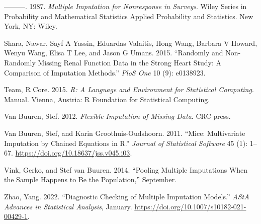 \documentclass[
]{article}
\newlength{\cslhangindent}
\newlength{\cslentryspacingunit} %
\newenvironment{CSLReferences}[2] %
 {%
  \setlength{\parindent}{0pt}
  \ifodd #1
  \let\oldpar\par
  \def\par{\hangindent=\cslhangindent\oldpar}
  \fi
  \setlength{\parskip}{#2\cslentryspacingunit}
 }%
 {}
\begin{document}
\begin{CSLReferences}{1}{0}
\leavevmode{}%
---------. 1987. \emph{Multiple {Imputation} for Nonresponse in
Surveys}. Wiley Series in Probability and Mathematical Statistics
{Applied} Probability and Statistics. {New York, NY}: {Wiley}.

\leavevmode{}%
Shara, Nawar, Sayf A Yassin, Eduardas Valaitis, Hong Wang, Barbara V
Howard, Wenyu Wang, Elisa T Lee, and Jason G Umans. 2015. {``Randomly
and Non-Randomly Missing Renal Function Data in the Strong Heart Study:
A Comparison of Imputation Methods.''} \emph{PloS One} 10 (9): e0138923.

\leavevmode{}%
Team, R Core. 2015. \emph{R: {A} Language and Environment for
Statistical Computing}. Manual. {Vienna, Austria}: {R Foundation for
Statistical Computing}.

\leavevmode{}%
Van Buuren, Stef. 2012. \emph{Flexible Imputation of Missing Data}. {CRC
press}.

\leavevmode{}%
Van Buuren, Stef, and Karin Groothuis-Oudshoorn. 2011. {``Mice:
{Multivariate Imputation} by {Chained Equations} in {R}.''}
\emph{Journal of Statistical Software} 45 (1): 1--67.
\url{https://doi.org/10.18637/jss.v045.i03}.

\leavevmode{}%
Vink, Gerko, and Stef van Buuren. 2014. {``Pooling Multiple Imputations
When the Sample Happens to Be the Population,''} September.

\leavevmode{}%
Zhao, Yang. 2022. {``Diagnostic Checking of Multiple Imputation
Models.''} \emph{AStA Advances in Statistical Analysis}, January.
\url{https://doi.org/10.1007/s10182-021-00429-1}.

\end{CSLReferences}
\end{document}
